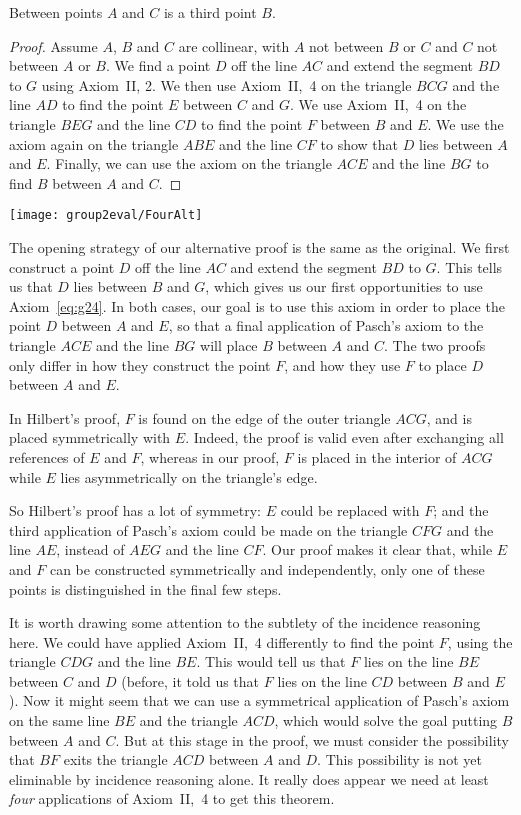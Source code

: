 \begin{proposition}
Between points $A$ and $C$ is a third point $B$.
\end{proposition}
\begin{proof}Assume $A$, $B$ and $C$ are collinear, with $A$ not between $B$ or $C$ and $C$ not between $A$ or $B$. We find a point $D$ off the line $AC$ and extend the segment $BD$ to $G$ using Axiom~II, 2. We then use Axiom~II,~4 on the triangle $BCG$ and the line $AD$ to find the point $E$ between $C$ and $G$. We use Axiom~II,~4 on the triangle $BEG$ and the line $CD$ to find the point $F$ between $B$ and $E$. We use the axiom again on the triangle $ABE$ and the line $CF$ to show that $D$ lies between $A$ and $E$. Finally, we can use the axiom on the triangle $ACE$ and the line $BG$ to find $B$ between $A$ and $C$.
\end{proof}
\begin{center}\texttt{[image: group2eval/FourAlt]}
\end{center}

The opening strategy of our alternative proof is the same as the original. We first construct a point $D$ off the line $AC$ and extend the segment $BD$ to $G$. This tells us that $D$ lies between $B$ and $G$, which gives us our first opportunities to use Axiom~\ref{eq:g24}. In both cases, our goal is to use this axiom in order to place the point $D$ between $A$ and $E$, so that a final application of Pasch's axiom to the triangle $ACE$ and the line $BG$ will place $B$ between $A$ and $C$. The two proofs only differ in how they construct the point $F$, and how they use $F$ to place $D$ between $A$ and $E$.

In Hilbert's proof, $F$ is found on the edge of the outer triangle $ACG$, and is placed symmetrically with $E$. Indeed, the proof is valid even after exchanging all references of $E$ and $F$, whereas in our proof, $F$ is placed in the interior of $ACG$ while $E$ lies asymmetrically on the triangle's edge. 

So Hilbert's proof has a lot of symmetry: $E$ could be replaced with $F$; and the third application of Pasch's axiom could be made on the triangle $CFG$ and the line $AE$, instead of $AEG$ and the line $CF$. Our proof makes it clear that, while $E$ and $F$ can be constructed symmetrically and independently, only one of these points is distinguished in the final few steps. 

It is worth drawing some attention to the subtlety of the incidence reasoning here. We could have applied Axiom~II,~4 differently to find the point $F$, using the triangle $CDG$ and the line $BE$. This would tell us that $F$ lies on the line $BE$ between $C$ and $D$ (before, it told us that $F$ lies on the line $CD$ between $B$ and $E$). Now it might seem that we can use a symmetrical application of Pasch's axiom on the same line $BE$ and the triangle $ACD$, which would solve the goal putting $B$ between $A$ and $C$. But at this stage in the proof, we must consider the possibility that $BF$ exits the triangle $ACD$ between $A$ and $D$. This possibility is not yet eliminable by incidence reasoning alone. It really does appear we need at least \emph{four} applications of Axiom~II,~4 to get this theorem.

